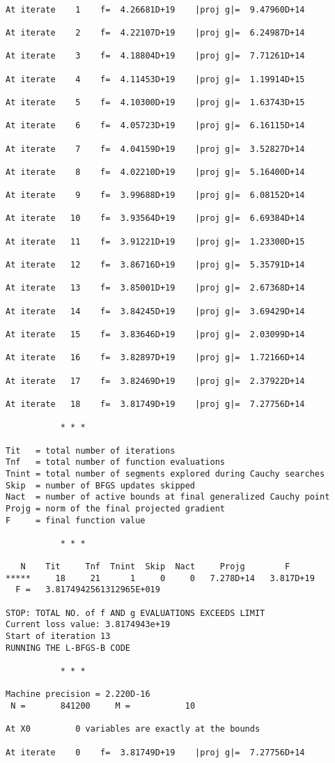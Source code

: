 \documentclass[11pt]{article}
\begin{document}
    \begin{Verbatim}[commandchars=\\\{\}]

At iterate    1    f=  4.26681D+19    |proj g|=  9.47960D+14

At iterate    2    f=  4.22107D+19    |proj g|=  6.24987D+14

At iterate    3    f=  4.18804D+19    |proj g|=  7.71261D+14

At iterate    4    f=  4.11453D+19    |proj g|=  1.19914D+15

At iterate    5    f=  4.10300D+19    |proj g|=  1.63743D+15

At iterate    6    f=  4.05723D+19    |proj g|=  6.16115D+14

At iterate    7    f=  4.04159D+19    |proj g|=  3.52827D+14

At iterate    8    f=  4.02210D+19    |proj g|=  5.16400D+14

At iterate    9    f=  3.99688D+19    |proj g|=  6.08152D+14

At iterate   10    f=  3.93564D+19    |proj g|=  6.69384D+14

At iterate   11    f=  3.91221D+19    |proj g|=  1.23300D+15

At iterate   12    f=  3.86716D+19    |proj g|=  5.35791D+14

At iterate   13    f=  3.85001D+19    |proj g|=  2.67368D+14

At iterate   14    f=  3.84245D+19    |proj g|=  3.69429D+14

At iterate   15    f=  3.83646D+19    |proj g|=  2.03099D+14

At iterate   16    f=  3.82897D+19    |proj g|=  1.72166D+14

At iterate   17    f=  3.82469D+19    |proj g|=  2.37922D+14

At iterate   18    f=  3.81749D+19    |proj g|=  7.27756D+14

           * * *

Tit   = total number of iterations
Tnf   = total number of function evaluations
Tnint = total number of segments explored during Cauchy searches
Skip  = number of BFGS updates skipped
Nact  = number of active bounds at final generalized Cauchy point
Projg = norm of the final projected gradient
F     = final function value

           * * *

   N    Tit     Tnf  Tnint  Skip  Nact     Projg        F
*****     18     21      1     0     0   7.278D+14   3.817D+19
  F =   3.8174942561312965E+019

STOP: TOTAL NO. of f AND g EVALUATIONS EXCEEDS LIMIT
Current loss value: 3.8174943e+19
Start of iteration 13
RUNNING THE L-BFGS-B CODE

           * * *

Machine precision = 2.220D-16
 N =       841200     M =           10

At X0         0 variables are exactly at the bounds

At iterate    0    f=  3.81749D+19    |proj g|=  7.27756D+14
    \end{Verbatim}
\end{document}
